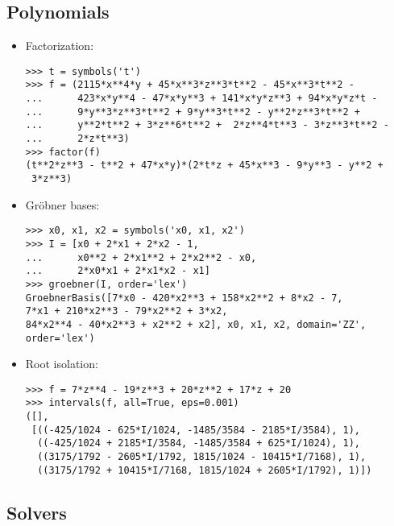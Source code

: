 \subsection{Polynomials}
\begin{itemize}
\item Factorization:
\begin{verbatim}
>>> t = symbols('t')
>>> f = (2115*x**4*y + 45*x**3*z**3*t**2 - 45*x**3*t**2 -
...      423*x*y**4 - 47*x*y**3 + 141*x*y*z**3 + 94*x*y*z*t -
...      9*y**3*z**3*t**2 + 9*y**3*t**2 - y**2*z**3*t**2 +
...      y**2*t**2 + 3*z**6*t**2 +  2*z**4*t**3 - 3*z**3*t**2 -
...      2*z*t**3)
>>> factor(f)
(t**2*z**3 - t**2 + 47*x*y)*(2*t*z + 45*x**3 - 9*y**3 - y**2 +
 3*z**3)
\end{verbatim}

\item Gr\"{o}bner bases:
\begin{verbatim}
>>> x0, x1, x2 = symbols('x0, x1, x2')
>>> I = [x0 + 2*x1 + 2*x2 - 1,
...      x0**2 + 2*x1**2 + 2*x2**2 - x0,
...      2*x0*x1 + 2*x1*x2 - x1]
>>> groebner(I, order='lex')
GroebnerBasis([7*x0 - 420*x2**3 + 158*x2**2 + 8*x2 - 7,
7*x1 + 210*x2**3 - 79*x2**2 + 3*x2,
84*x2**4 - 40*x2**3 + x2**2 + x2], x0, x1, x2, domain='ZZ',
order='lex')
\end{verbatim}

\item Root isolation:
\begin{verbatim}
>>> f = 7*z**4 - 19*z**3 + 20*z**2 + 17*z + 20
>>> intervals(f, all=True, eps=0.001)
([],
 [((-425/1024 - 625*I/1024, -1485/3584 - 2185*I/3584), 1),
  ((-425/1024 + 2185*I/3584, -1485/3584 + 625*I/1024), 1),
  ((3175/1792 - 2605*I/1792, 1815/1024 - 10415*I/7168), 1),
  ((3175/1792 + 10415*I/7168, 1815/1024 + 2605*I/1792), 1)])
\end{verbatim}
\end{itemize}
\subsection{Solvers}

